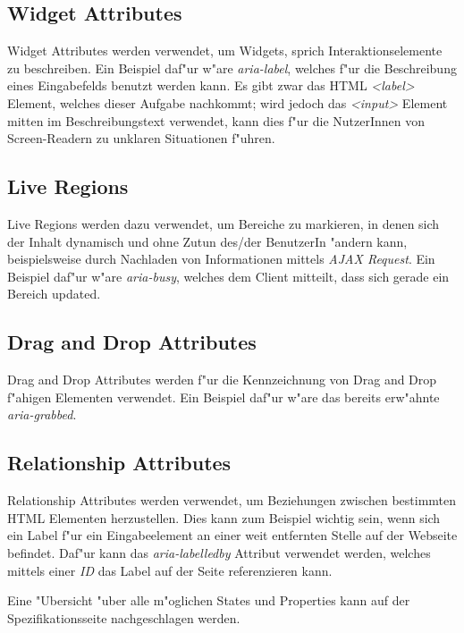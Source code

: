 \documentclass[a4paper,bibtotoc,oneside]{scrbook}
\begin{document}
\subsection{Widget Attributes}
Widget Attributes werden verwendet, um Widgets, sprich Interaktionselemente zu beschreiben. Ein Beispiel daf"ur w"are \emph{aria-label}, welches f"ur die Beschreibung eines Eingabefelds benutzt werden kann. Es gibt zwar das HTML \emph{<label>} Element, welches dieser Aufgabe nachkommt; wird jedoch das \emph{<input>} Element mitten im Beschreibungstext verwendet, kann dies f"ur die NutzerInnen von Screen-Readern zu unklaren Situationen f"uhren. \cite[Abschnitt 6.6, aria-label]{aria_states}

\subsection{Live Regions}
Live Regions werden dazu verwendet, um Bereiche zu markieren, in denen sich der Inhalt dynamisch und ohne Zutun des/der BenutzerIn "andern kann, beispielsweise durch Nachladen von Informationen mittels \emph{AJAX Request}. Ein Beispiel daf"ur w"are \emph{aria-busy}, welches dem Client mitteilt, dass sich gerade ein Bereich updated. \cite[Abschnitt 6.6, aria-busy]{aria_states}

\subsection{Drag and Drop Attributes}
Drag and Drop Attributes werden f"ur die Kennzeichnung von Drag and Drop f"ahigen Elementen verwendet. Ein Beispiel daf"ur w"are das bereits erw"ahnte \emph{aria-grabbed}. \cite[Abschnitt 6.6, aria-grabbed]{aria_states}

\subsection{Relationship Attributes}
Relationship Attributes werden verwendet, um Beziehungen zwischen bestimmten HTML Elementen herzustellen. Dies kann zum Beispiel wichtig sein, wenn sich ein Label f"ur ein Eingabeelement an einer weit entfernten Stelle auf der Webseite befindet. Daf"ur kann das \emph{aria-labelledby} Attribut verwendet werden, welches mittels einer \emph{ID} das Label auf der Seite referenzieren kann. \cite[Abschnitt 6.6, aria-labelledby]{aria_states}

Eine "Ubersicht "uber alle m"oglichen States und Properties kann auf der Spezifikationsseite nachgeschlagen werden. \cite[Abschnitt 6.6]{aria_states}
\end{document}
